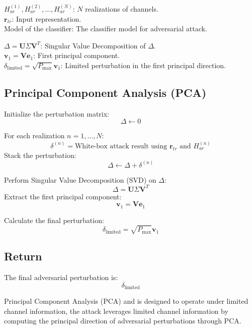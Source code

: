 
$H^{(1)}_{ar}, H^{(2)}_{ar}, \ldots, H^{(N)}_{ar}$: $N$ realizations of channels. \\
$\mathbf{r}_{tr}$: Input representation. \\
Model of the classifier: The classifier model for adversarial attack.

$\Delta = \mathbf{U} \Sigma \mathbf{V}^T$: Singular Value Decomposition of $\Delta$. \\
$\mathbf{v}_1 = \mathbf{V}\mathbf{e}_1$: First principal component. \\
$\delta_{\text{limited}} = \sqrt{P_{\text{max}}} \mathbf{v}_1$: Limited perturbation in the first principal direction.

\subsection*{Principal Component Analysis (PCA)}
Initialize the perturbation matrix:
\[
\Delta \leftarrow 0
\]

For each realization $n = 1, \ldots, N$:
\[
\delta^{(n)} = \text{White-box attack result using } \mathbf{r}_{tr} \text{ and } H^{(n)}_{ar}
\]
Stack the perturbation:
\[
\Delta \leftarrow \Delta + \delta^{(n)}
\]

Perform Singular Value Decomposition (SVD) on $\Delta$:
\[
\Delta = \mathbf{U} \Sigma \mathbf{V}^T
\]
Extract the first principal component:
\[
\mathbf{v}_1 = \mathbf{V} \mathbf{e}_1
\]

Calculate the final perturbation:
\[
\delta_{\text{limited}} = \sqrt{P_{\text{max}}} \mathbf{v}_1
\]

\subsection*{Return}
The final adversarial perturbation is:
\[
\delta_{\text{limited}}
\]

Principal Component Analysis (PCA) and is designed to operate under limited channel information, the attack leverages limited channel information by computing the principal direction of adversarial perturbations through PCA.